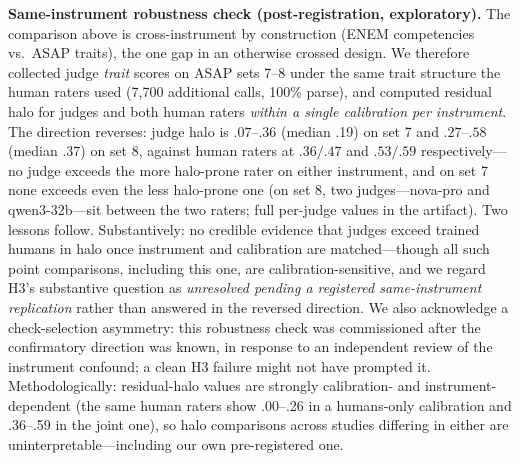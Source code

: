 \documentclass[fleqn,10pt]{JLA_article}
\begin{document}
\medskip\noindent\textbf{Same-instrument robustness check (post-registration, exploratory).} The comparison above is cross-instrument by construction (ENEM competencies vs.\ ASAP traits), the one gap in an otherwise crossed design. We therefore collected judge \emph{trait} scores on ASAP sets 7--8 under the same trait structure the human raters used (7,700 additional calls, 100\% parse), and computed residual halo for judges and both human raters \emph{within a single calibration per instrument}. The direction reverses: judge halo is $.07$--$.36$ (median .19) on set 7 and $.27$--$.58$ (median .37) on set 8, against human raters at $.36/.47$ and $.53/.59$ respectively---no judge exceeds the more halo-prone rater on either instrument, and on set 7 none exceeds even the less halo-prone one (on set 8, two judges---nova-pro and qwen3-32b---sit between the two raters; full per-judge values in the artifact). Two lessons follow. Substantively: no credible evidence that judges exceed trained humans in halo once instrument and calibration are matched---though all such point comparisons, including this one, are calibration-sensitive, and we regard H3's substantive question as \emph{unresolved pending a registered same-instrument replication} rather than answered in the reversed direction. We also acknowledge a check-selection asymmetry: this robustness check was commissioned after the confirmatory direction was known, in response to an independent review of the instrument confound; a clean H3 failure might not have prompted it. Methodologically: residual-halo values are strongly calibration- and instrument-dependent (the same human raters show .00--.26 in a humans-only calibration and .36--.59 in the joint one), so halo comparisons across studies differing in either are uninterpretable---including our own pre-registered one.
\end{document}
